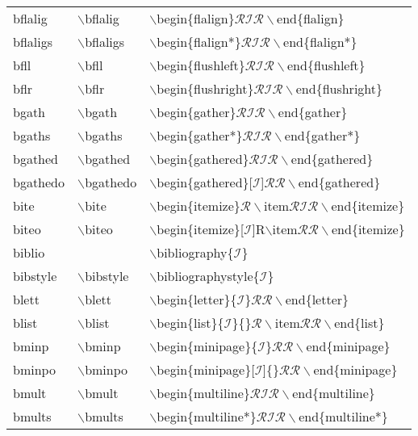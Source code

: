 \begin{longtable}{p{20mm}p{20mm}p{65mm}}
bflalig & $\backslash$bflalig & $\backslash$begin\{flalign\}$\mathcal{RIR}\backslash$end\{flalign\}\\
bflaligs & $\backslash$bflaligs & $\backslash$begin\{flalign*\}$\mathcal{RIR}\backslash$end\{flalign*\}\\
bfll & $\backslash$bfll & $\backslash$begin\{flushleft\}$\mathcal{RIR}\backslash$end\{flushleft\}\\
bflr & $\backslash$bflr & $\backslash$begin\{flushright\}$\mathcal{RIR}\backslash$end\{flushright\}\\
bgath & $\backslash$bgath & $\backslash$begin\{gather\}$\mathcal{RIR}\backslash$end\{gather\}\\
bgaths & $\backslash$bgaths & $\backslash$begin\{gather*\}$\mathcal{RIR}\backslash$end\{gather*\}\\
bgathed & $\backslash$bgathed & $\backslash$begin\{gathered\}$\mathcal{RIR}\backslash$end\{gathered\}\\
bgathedo & $\backslash$bgathedo & $\backslash$begin\{gathered\}[$\mathcal{I}$]$\mathcal{RR}\backslash$end\{gathered\}\\
bite & $\backslash$bite & $\backslash$begin\{itemize\}$\mathcal{R}\backslash$item$\mathcal{RIR}\backslash$end\{itemize\}\\
biteo & $\backslash$biteo & $\backslash$begin\{itemize\}[$\mathcal{I}$]R$\backslash$item$\mathcal{RR}\backslash$end\{itemize\}\\
biblio &  & $\backslash$bibliography\{$\mathcal{I}$\}\\
bibstyle & $\backslash$bibstyle & $\backslash$bibliographystyle\{$\mathcal{I}$\}\\
blett & $\backslash$blett & $\backslash$begin\{letter\}\{$\mathcal{I}$\}$\mathcal{RR}\backslash$end\{letter\}\\
blist & $\backslash$blist & $\backslash$begin\{list\}\{$\mathcal{I}$\}\{\}$\mathcal{R}\backslash$item$\mathcal{RR}\backslash$end\{list\}\\
bminp & $\backslash$bminp & $\backslash$begin\{minipage\}\{$\mathcal{I}$\}$\mathcal{RR}\backslash$end\{minipage\}\\
bminpo & $\backslash$bminpo & $\backslash$begin\{minipage\}[$\mathcal{I}$]\{\}$\mathcal{RR}\backslash$end\{minipage\}\\
bmult & $\backslash$bmult & $\backslash$begin\{multiline\}$\mathcal{RIR}\backslash$end\{multiline\}\\
bmults & $\backslash$bmults & $\backslash$begin\{multiline*\}$\mathcal{RIR}\backslash$end\{multiline*\}\\

\end{longtable}
